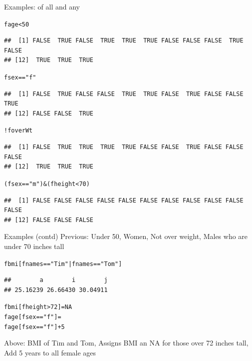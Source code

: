 \documentclass{beamer}\usepackage[]{graphicx}\usepackage[]{color}
\makeatletter
\newcommand{\hlnum}[1]{\textcolor[rgb]{0.686,0.059,0.569}{#1}}%
\newcommand{\hlstr}[1]{\textcolor[rgb]{0.192,0.494,0.8}{#1}}%
\newcommand{\hlopt}[1]{\textcolor[rgb]{0,0,0}{#1}}%
\newcommand{\hlstd}[1]{\textcolor[rgb]{0.345,0.345,0.345}{#1}}%
\newcommand{\hlkwb}[1]{\textcolor[rgb]{0.69,0.353,0.396}{#1}}%
\newenvironment{kframe}{%
 \def\at@end@of@kframe{}%
 \ifinner\ifhmode%
  \def\at@end@of@kframe{\end{minipage}}%
  \begin{minipage}{\columnwidth}%
 \fi\fi%
 \def\FrameCommand##1{\hskip\@totalleftmargin \hskip-\fboxsep
 \colorbox{shadecolor}{##1}\hskip-\fboxsep
     \hskip-\linewidth \hskip-\@totalleftmargin \hskip\columnwidth}%
 \MakeFramed {\advance\hsize-\width
   \@totalleftmargin\z@ \linewidth\hsize
   \@setminipage}}%
 {\par\unskip\endMakeFramed%
 \at@end@of@kframe}
\newenvironment{knitrout}{}{} %
\renewenvironment{knitrout}{\begin{singlespace}}{\end{singlespace}}
\theoremstyle{mystyle}
\makeatother
\begin{document}
\begin{frame}[fragile]{Examples: of all and any}
\begin{knitrout}
\color{fgcolor}\begin{kframe}
\begin{alltt}
\hlstd{fage} \hlopt{<} \hlnum{50}
\end{alltt}
\begin{verbatim}
##  [1] FALSE  TRUE FALSE  TRUE  TRUE  TRUE FALSE FALSE FALSE  TRUE FALSE
## [12]  TRUE  TRUE  TRUE
\end{verbatim}
\begin{alltt}
\hlstd{fsex} \hlopt{==} \hlstr{"f"}
\end{alltt}
\begin{verbatim}
##  [1] FALSE  TRUE FALSE FALSE  TRUE  TRUE FALSE  TRUE FALSE FALSE  TRUE
## [12] FALSE FALSE  TRUE
\end{verbatim}
\begin{alltt}
\hlopt{!}\hlstd{foverWt}
\end{alltt}
\begin{verbatim}
##  [1] FALSE  TRUE  TRUE  TRUE  TRUE FALSE FALSE  TRUE FALSE FALSE FALSE
## [12]  TRUE  TRUE  TRUE
\end{verbatim}
\begin{alltt}
\hlstd{(fsex} \hlopt{==} \hlstr{"m"}\hlstd{)} \hlopt{&}\hlstd{(fheight} \hlopt{<} \hlnum{70}\hlstd{)}
\end{alltt}
\begin{verbatim}
##  [1] FALSE FALSE FALSE FALSE FALSE FALSE FALSE FALSE FALSE FALSE FALSE
## [12] FALSE FALSE FALSE
\end{verbatim}
\end{kframe}
\end{knitrout}
\end{frame}

\begin{frame}[fragile]{Examples (contd)}
Previous: Under 50, Women, Not over weight, Males who are under 70 inches tall

\begin{knitrout}
\color{fgcolor}\begin{kframe}
\begin{alltt}
\hlstd{fbmi[fnames} \hlopt{==}\hlstr{"Tim"} \hlopt{|} \hlstd{fnames} \hlopt{==} \hlstr{"Tom"} \hlstd{]}
\end{alltt}
\begin{verbatim}
##        a        i        j 
## 25.16239 26.66430 30.04911
\end{verbatim}
\begin{alltt}
\hlstd{fbmi[fheight} \hlopt{>}\hlnum{72}\hlstd{]} \hlkwb{=} \hlnum{NA}
\hlstd{fage[fsex} \hlopt{==} \hlstr{"f"}\hlstd{]} \hlkwb{=}
 \hlstd{fage[fsex} \hlopt{==} \hlstr{"f"}\hlstd{]} \hlopt{+} \hlnum{5}
\end{alltt}
\end{kframe}
\end{knitrout}
Above: BMI of Tim and Tom, Assigns BMI an NA for those over 72 inches tall, Add 5 years to all female ages
\end{frame}
\end{document}
